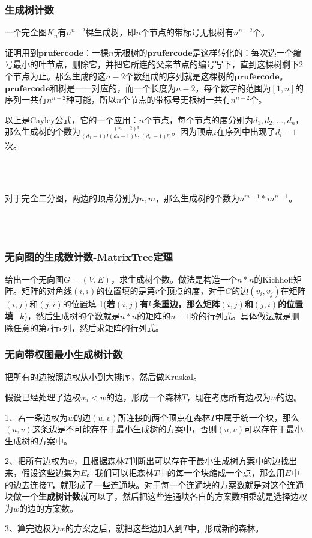 	\subsubsection{生成树计数}
	一个完全图$K_n$有$n^{n-2}$棵生成树，即$n$个节点的带标号无根树有$n^{n-2}$个。\par
	证明用到$\mathbf{prufer code}$：一棵$n$无根树的$\mathbf{prufer code}$是这样转化的：每次选一个编号最小的叶节点，删除它，并把它所连的父亲节点的编号写下，直到这棵树剩下2个节点为止。那么生成的这$n-2$个数组成的序列就是这棵树的$\mathbf{prufer code}$。$\mathbf{prufer code}$和树是一一对应的，而一个长度为$n-2$，每个数字的范围为$[1,n]$的序列一共有$n^{n-2}$种可能，所以$n$个节点的带标号无根树一共有$n^{n-2}$个。\par
	以上是Cayley公式，它的一个应用：$n$个节点，每个节点的度分别为$d_1,d_2,\ldots,d_n$，那么生成树的个数为$\frac{(n-2)!}{(d_1-1)!(d_2-1)!\cdots(d_n-1)!)}$。因为顶点$i$在序列中出现了$d_i-1$次。\par
	~\\
	~\\ \par
		对于完全二分图，两边的顶点分别为$n,m$，那么生成树的个数为$n^{m-1}*m^{n-1}$。\par
		~\\
		~\\ \par
	\subsubsection{无向图的生成数计数-MatrixTree定理}
		给出一个无向图$G=(V,E)$，求生成树个数。做法是构造一个$n*n$的Kichhoff矩阵。矩阵的对角线$(i,i)$的位置填的是第$i$个顶点的度，对于$G$的边$(v_i,v_j)$在矩阵$(i,j)$和$(j,i)$的位置填-1(\textbf{若$(i,j)$有$k$条重边，那么矩阵$(i,j)$和$(j,i)$的位置填$-k$})，然后生成树的个数就是$n*n$的矩阵的$n-1$阶的行列式。具体做法就是删除任意的第$r$行$r$列，然后求矩阵的行列式。
	~\\
	\subsubsection{无向带权图最小生成树计数}
		把所有的边按照边权从小到大排序，然后做Kruskal。\par
		假设已经处理了边权$w_i<w$的边，形成一个森林$T$，现在考虑所有边权为$w$的边。\par
		1、若一条边权为$w$的边$(u,v)$所连接的两个顶点在森林$T$中属于统一个块，那么$(u,v)$这条边是不可能存在于最小生成树的方案中，否则$(u,v)$可以存在于最小生成树的方案中。\par
		2、把所有边权为$w$，且根据森林$T$判断出可以存在于最小生成树方案中的边找出来，假设这些边集为$E$。我们可以把森林$T$中的每一个块缩成一个点，那么用$E$中的边去连接$T$，就形成了一些连通块。对于每一个连通块的方案数就是对这个连通块做一个\textbf{生成树计数}就可以了，然后把这些连通块各自的方案数相乘就是选择边权为$w$的边的方案数。\par
		3、算完边权为$w$的方案之后，就把这些边加入到$T$中，形成新的森林。\par

